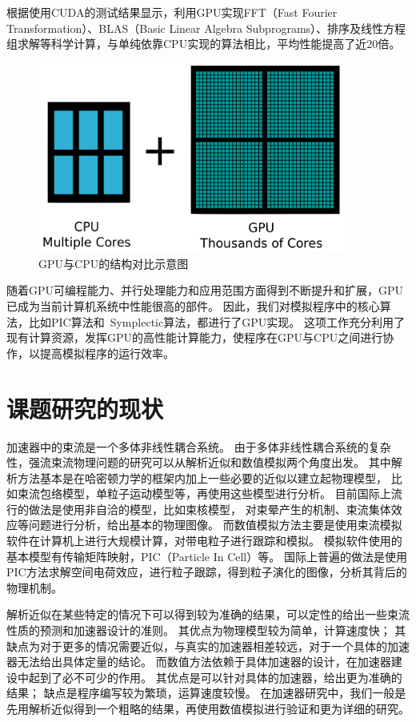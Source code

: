 根据使用CUDA的测试结果显示，利用GPU实现FFT（Fast Fourier Transformation）、BLAS（Basic Linear Algebra Subprograms）、排序及线性方程组求解等科学计算，与单纯依靠CPU实现的算法相比，平均性能提高了近20倍。
\begin{figure}[!htb]
    \centering
    \includegraphics[width=0.9\textwidth]{Img/GPU_vs_CPU.png}
    \caption{GPU与CPU的结构对比示意图}
    \label{fig:GPU}
\end{figure}

随着GPU可编程能力、并行处理能力和应用范围方面得到不断提升和扩展，GPU已成为当前计算机系统中性能很高的部件。
因此，我们对模拟程序中的核心算法，比如PIC算法和~Symplectic算法，都进行了GPU实现。
这项工作充分利用了现有计算资源，发挥GPU的高性能计算能力，使程序在GPU与CPU之间进行协作，以提高模拟程序的运行效率。

\section{课题研究的现状}
加速器中的束流是一个多体非线性耦合系统。
由于多体非线性耦合系统的复杂性，强流束流物理问题的研究可以从解析近似和数值模拟两个角度出发。
其中解析方法基本是在哈密顿力学的框架内加上一些必要的近似以建立起物理模型，
比如束流包络模型，单粒子运动模型等，再使用这些模型进行分析。
目前国际上流行的做法是使用非自洽的模型，比如束核模型，
对束晕产生的机制、束流集体效应等问题进行分析，给出基本的物理图像。
而数值模拟方法主要是使用束流模拟软件在计算机上进行大规模计算，对带电粒子进行跟踪和模拟。
模拟软件使用的基本模型有传输矩阵映射，PIC（Particle In Cell）等。
国际上普遍的做法是使用PIC方法求解空间电荷效应，进行粒子跟踪，得到粒子演化的图像，分析其背后的物理机制。

解析近似在某些特定的情况下可以得到较为准确的结果，可以定性的给出一些束流性质的预测和加速器设计的准则。
其优点为物理模型较为简单，计算速度快；
其缺点为对于更多的情况需要近似，与真实的加速器相差较远，对于一个具体的加速器无法给出具体定量的结论。
而数值方法依赖于具体加速器的设计，在加速器建设中起到了必不可少的作用。
其优点是可以针对具体的加速器，给出更为准确的结果；
缺点是程序编写较为繁琐，运算速度较慢。
在加速器研究中，我们一般是先用解析近似得到一个粗略的结果，再使用数值模拟进行验证和更为详细的研究。

